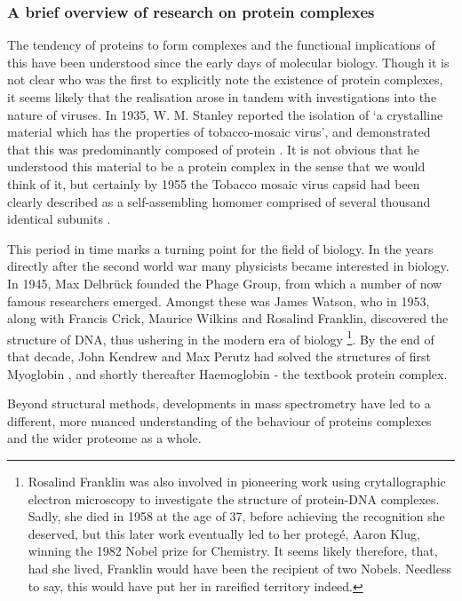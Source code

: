 \documentclass[a4paper,11pt,twoside,openright]{scrbook}
\begin{document}
\subsubsection{A brief overview of research on protein complexes}
The tendency of proteins to form complexes and the functional implications of this have been understood since the early days of molecular biology. Though it is not clear who was the first to explicitly note the existence of protein complexes, it seems likely that the realisation arose in tandem with investigations into the nature of viruses. In 1935, W. M. Stanley reported the isolation of `a crystalline material which has the properties of tobacco-mosaic virus', and demonstrated that this was predominantly composed of protein \cite{Stanley1935}. It is not obvious that he understood this material to be a protein complex in the sense that we would think of it, but certainly by 1955 the Tobacco mosaic virus capsid had been clearly described as a self-assembling homomer comprised of several thousand identical subunits \cite{Fraenkel-Conrat1955}.

This period in time marks a turning point for the field of biology. In the years directly after the second world war many physicists became interested in biology. In 1945, Max Delbr{\"u}ck founded the Phage Group, from which a number of now famous researchers emerged. Amongst these was James Watson, who in 1953, along with Francis Crick, Maurice Wilkins and Rosalind Franklin, discovered the structure of DNA, thus ushering in the modern era of biology \footnote{ Rosalind Franklin was also involved in pioneering work using crytallographic electron microscopy to investigate the structure of protein-DNA complexes. Sadly, she died in 1958 at the age of 37, before achieving the recognition she deserved, but this later work eventually led to her proteg{\'e},  Aaron Klug, winning the 1982 Nobel prize for Chemistry. It seems likely therefore, that, had she lived, Franklin would have been the recipient of two Nobels. Needless to say, this would have put her in rareified territory indeed.}.
By the end of that decade, John Kendrew and Max Perutz had solved the structures of first Myoglobin \cite{Kendrew1958}, and shortly thereafter Haemoglobin \cite{Perutz1960} - the textbook protein complex.


Beyond structural methods, developments in mass spectrometry have led to a different, more nuanced understanding of the behaviour of proteins complexes and the wider proteome as a whole.
\end{document}
